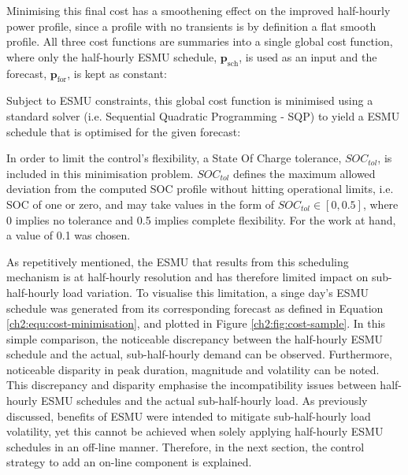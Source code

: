 


Minimising this final cost has a smoothening effect on the improved half-hourly power profile, since a profile with no transients is by definition a flat smooth profile.
All three cost functions are summaries into a single global cost function, where only the half-hourly ESMU schedule, $\textbf{p}_\text{sch}$, is used as an input and the forecast, $\textbf{p}_\text{for}$, is kept as constant:



Subject to ESMU constraints, this global cost function is minimised using a standard solver (i.e. Sequential Quadratic Programming - SQP) to yield a ESMU schedule that is optimised for the given forecast:



In order to limit the control's flexibility, a State Of Charge tolerance, $SOC_{tol}$, is included in this minimisation problem.
$SOC_{tol}$ defines the maximum allowed deviation from the computed SOC profile without hitting operational limits, i.e. SOC of one or zero, and may take values in the form of $SOC_{tol} \in [0, 0.5]$, where 0 implies no tolerance and 0.5 implies complete flexibility.
For the work at hand, a value of 0.1 was chosen.



As repetitively mentioned, the ESMU that results from this scheduling mechanism is at half-hourly resolution and has therefore limited impact on sub-half-hourly load variation.
To visualise this limitation, a singe day's ESMU schedule was generated from its corresponding forecast as defined in Equation \ref{ch2:equ:cost-minimisation}, and plotted in Figure \ref{ch2:fig:cost-sample}.
In this simple comparison, the noticeable discrepancy between the half-hourly ESMU schedule and the actual, sub-half-hourly demand can be observed.
Furthermore, noticeable disparity in peak duration, magnitude and volatility can be noted.
This discrepancy and disparity emphasise the incompatibility issues between half-hourly ESMU schedules and the actual sub-half-hourly load.
As previously discussed, benefits of ESMU were intended to mitigate sub-half-hourly load volatility, yet this cannot be achieved when solely applying half-hourly ESMU schedules in an off-line manner.
Therefore, in the next section, the control strategy to add an on-line component is explained.




 